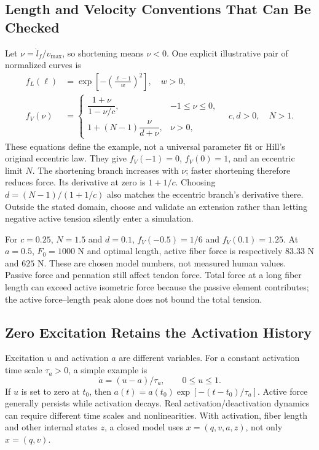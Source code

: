 \subsection{Length and Velocity Conventions That Can Be Checked}

Let $\nu=\dot l_f/v_{\max}$, so shortening means $\nu<0$.
One explicit illustrative pair of normalized curves is
\begin{align}
f_L(\ell)&=\exp\left[-\left(\frac{\ell-1}{w}\right)^2\right],\quad w>0,
\label{eq:ch8:force-length}\\
f_V(\nu)&=
\begin{cases}
\dfrac{1+\nu}{1-\nu/c},&-1\leq\nu\leq0,\\[4pt]
1+(N-1)\dfrac{\nu}{d+\nu},&\nu>0,
\end{cases}
\quad c,d>0,\quad N>1.
\label{eq:ch8:force-velocity}
\end{align}
These equations define the example, not a universal parameter fit or Hill's
original eccentric law. They give $f_V(-1)=0$, $f_V(0)=1$, and an eccentric
limit $N$. The shortening branch increases with $\nu$; faster shortening
therefore reduces force. Its derivative at zero is $1+1/c$. Choosing
$d=(N-1)/(1+1/c)$ also matches the eccentric branch's derivative there.
Outside the stated domain, choose and validate an extension rather than letting
negative active tension silently enter a simulation.

For $c=0.25$, $N=1.5$ and $d=0.1$, $f_V(-0.5)=1/6$ and
$f_V(0.1)=1.25$. At $a=0.5$, $F_0=1000$ N and optimal length, active fiber
force is respectively $83.33$ N and $625$ N. These are chosen model numbers,
not measured human values. Passive force and pennation still affect tendon
force. Total force at a long fiber length can exceed active isometric force
because the passive element contributes; the active force--length peak alone
does not bound the total tension.

\subsection{Zero Excitation Retains the Activation History}

Excitation $u$ and activation $a$ are different variables. For a constant
activation time scale $\tau_a>0$, a simple example is
\begin{equation}
\dot a=(u-a)/\tau_a,\qquad 0\leq u\leq1.
\label{eq:ch8:activation}
\end{equation}
If $u$ is set to zero at $t_0$, then
$a(t)=a(t_0)\exp[-(t-t_0)/\tau_a]$. Active force generally persists while
activation decays. Real activation/deactivation dynamics can require different
time scales and nonlinearities. With activation, fiber length and other internal
states $z$, a closed model uses $x=(q,v,a,z)$, not only $x=(q,v)$.

